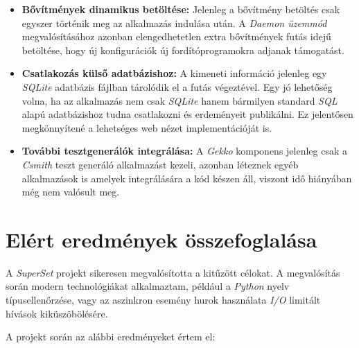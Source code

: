 \begin{itemize}
              és soha nem terminálna.
        \item \textbf{Bővítmények dinamikus betöltése:} Jelenleg a bővítmény betöltés csak egyszer történik meg az
              alkalmazás indulása után. A \textit{Daemon üzemmód} megvalósításához azonban elengedhetetlen extra
              bővítmények futás idejű betöltése, hogy új konfigurációk új fordítóprogramokra adjanak támogatást.
        \item \textbf{Csatlakozás külső adatbázishoz:} A kimeneti információ jelenleg egy \textit{SQLite} adatbázis
              fájlban tárolódik el a futás végeztével. Egy jó lehetőség volna, ha az alkalmazás nem csak
              \textit{SQLite} hanem bármilyen standard \textit{SQL} alapú adatbázishoz tudna csatlakozni és erdeményeit
              publikálni. Ez jelentősen megkönnyítené a lehetséges web nézet implementációját is.
        \item \textbf{További tesztgenerálók integrálása:} A \textit{Gekko} komponens jelenleg csak a \textit{Csmith} teszt
              generáló alkalmazást kezeli, azonban léteznek egyéb alkalmazások is amelyek integrálására a kód készen
              áll, viszont idő hiányában még nem valósult meg.
    \end{itemize}

\section{Elért eredmények összefoglalása}

    A \textit{SuperSet} projekt sikeresen megvalósította a kitűzött célokat. A megvalósítás során modern technológiákat
    alkalmaztam, például a \textit{Python} nyelv típusellenőrzése, vagy az aszinkron esemény hurok használata
    \textit{I/O} limitált hívások kiküszöbölésére.

    A projekt során az alábbi eredményeket értem el:


